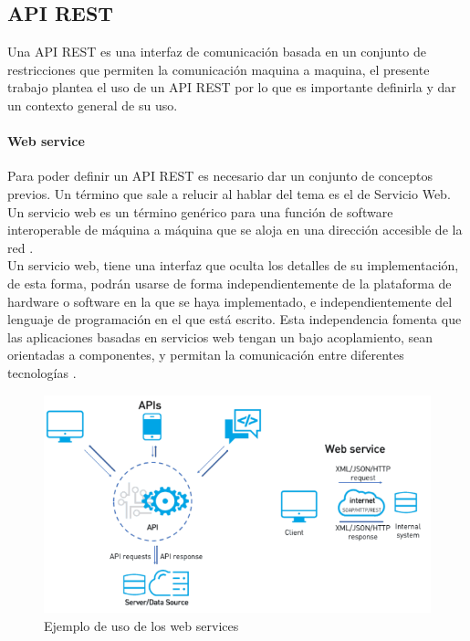 \subsection{API REST}
Una API REST es una interfaz de comunicación basada en un conjunto de restricciones que permiten la comunicación maquina a maquina, el presente trabajo plantea el uso de un API REST por lo que es importante definirla y dar un contexto general de su uso.

\paragraph{Web service} Para poder definir un API REST es necesario dar un conjunto de conceptos previos. Un término que sale a relucir al hablar del tema es el de Servicio Web.
\\
Un servicio web es un término genérico para una función de software interoperable de máquina a máquina que se aloja en una dirección accesible de la red \citep{MarcoTeorico11}.
\\
Un servicio web, tiene una interfaz que oculta los detalles de su implementación, de esta forma, podrán usarse de forma independientemente de la plataforma de hardware o software en la que se haya implementado, e independientemente del lenguaje de programación en el que está escrito. Esta independencia fomenta que las aplicaciones basadas en servicios web tengan un bajo acoplamiento, sean orientadas a componentes, y permitan la comunicación entre diferentes tecnologías \citep{MarcoTeorico11}.

\begin{figure}[H]
	\centering
	\includegraphics[scale=.6]{Capitulo2/images/web_service}
	\caption{Ejemplo de uso de los web services}
	\label{fig:web_service}
\end{figure}

